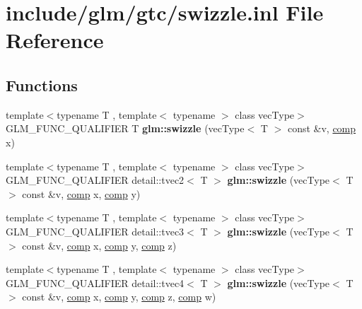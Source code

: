 \hypertarget{swizzle_8inl}{\section{include/glm/gtc/swizzle.inl \-File \-Reference}
\label{swizzle_8inl}
}
\subsection*{\-Functions}
\begin{DoxyCompactItemize}
\item 
\hypertarget{namespaceglm_a0feedd50fb50b4c2b16a7a87b4ac3e84}{{\footnotesize template$<$typename T , template$<$ typename $>$ class vec\-Type$>$ }\\\-G\-L\-M\-\_\-\-F\-U\-N\-C\-\_\-\-Q\-U\-A\-L\-I\-F\-I\-E\-R \-T {\bfseries glm\-::swizzle} (vec\-Type$<$ \-T $>$ const \&v, \hyperlink{structcomp}{comp} x)}\label{namespaceglm_a0feedd50fb50b4c2b16a7a87b4ac3e84}

\item 
\hypertarget{namespaceglm_a599268a7c64498961ab50d3146bf840a}{{\footnotesize template$<$typename T , template$<$ typename $>$ class vec\-Type$>$ }\\\-G\-L\-M\-\_\-\-F\-U\-N\-C\-\_\-\-Q\-U\-A\-L\-I\-F\-I\-E\-R \*
detail\-::tvec2$<$ \-T $>$ {\bfseries glm\-::swizzle} (vec\-Type$<$ \-T $>$ const \&v, \hyperlink{structcomp}{comp} x, \hyperlink{structcomp}{comp} y)}\label{namespaceglm_a599268a7c64498961ab50d3146bf840a}

\item 
\hypertarget{namespaceglm_a0752dd6ad8666916ac92a56874ca157e}{{\footnotesize template$<$typename T , template$<$ typename $>$ class vec\-Type$>$ }\\\-G\-L\-M\-\_\-\-F\-U\-N\-C\-\_\-\-Q\-U\-A\-L\-I\-F\-I\-E\-R \*
detail\-::tvec3$<$ \-T $>$ {\bfseries glm\-::swizzle} (vec\-Type$<$ \-T $>$ const \&v, \hyperlink{structcomp}{comp} x, \hyperlink{structcomp}{comp} y, \hyperlink{structcomp}{comp} z)}\label{namespaceglm_a0752dd6ad8666916ac92a56874ca157e}

\item 
\hypertarget{namespaceglm_aedead97fcea0dbecb8d8b8341cfc9fb8}{{\footnotesize template$<$typename T , template$<$ typename $>$ class vec\-Type$>$ }\\\-G\-L\-M\-\_\-\-F\-U\-N\-C\-\_\-\-Q\-U\-A\-L\-I\-F\-I\-E\-R \*
detail\-::tvec4$<$ \-T $>$ {\bfseries glm\-::swizzle} (vec\-Type$<$ \-T $>$ const \&v, \hyperlink{structcomp}{comp} x, \hyperlink{structcomp}{comp} y, \hyperlink{structcomp}{comp} z, \hyperlink{structcomp}{comp} w)}\label{namespaceglm_aedead97fcea0dbecb8d8b8341cfc9fb8}


\end{DoxyCompactItemize}
